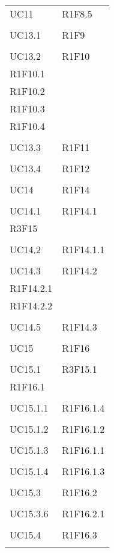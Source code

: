 \begin{longtable}{ >{\centering}p{}
		>{\centering}p{}}
	UC11 & R1F8.5\\
	\tabularnewline
	
	UC13.1 & R1F9\\
	\tabularnewline
	
	UC13.2 & R1F10\\
	R1F10.1 \\R1F10.2 \\R1F10.3 \\R1F10.4 \\\tabularnewline
	
	UC13.3 & R1F11\\
	\tabularnewline
	
	UC13.4 & R1F12\\
	\tabularnewline
	
	UC14 & R1F14\\
	\tabularnewline
	
	UC14.1 & R1F14.1\\
	R3F15 \\\tabularnewline
	
	UC14.2 & R1F14.1.1\\
	\tabularnewline
	
	UC14.3 & R1F14.2\\
	R1F14.2.1 \\R1F14.2.2 \\\tabularnewline
	
	UC14.5 & R1F14.3\\
	\tabularnewline
	
	UC15 & R1F16\\
	\tabularnewline
	
	UC15.1 & R3F15.1\\
	R1F16.1 \\\tabularnewline
	
	UC15.1.1 & R1F16.1.4\\
	\tabularnewline
	
	UC15.1.2 & R1F16.1.2\\
	\tabularnewline
	
	UC15.1.3 & R1F16.1.1\\
	\tabularnewline
	
	UC15.1.4 & R1F16.1.3\\
	\tabularnewline
	
	UC15.3 & R1F16.2\\
	\tabularnewline
	
	UC15.3.6 & R1F16.2.1\\
	\tabularnewline
	
	UC15.4 & R1F16.3\\
	\tabularnewline
	

\end{longtable}
